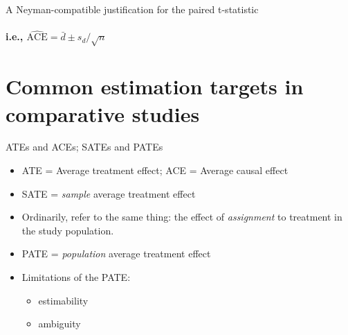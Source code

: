 
\begin{frame}{A Neyman-compatible justification for the paired t-statistic}
 \framesubtitle{i.e., $\widehat{\mathrm{ACE}} = \bar{d} \pm s_{d}/\sqrt{n}$} 

\end{frame}

\section{Common estimation targets in comparative studies}


\begin{frame}{ATEs and ACEs; SATEs and PATEs}

  \begin{itemize}
  \item ATE = Average treatment effect; ACE = Average causal effect

  \item SATE = \textit{sample} average treatment effect
  \item Ordinarily, refer to the same thing: the effect of \textit{assignment} to treatment in the study population.
  \item PATE = \textit{population} average treatment effect
  \item Limitations of the PATE:
    \begin{itemize}
    \item estimability
    \item ambiguity
    \end{itemize}

  \end{itemize}

\end{frame}


